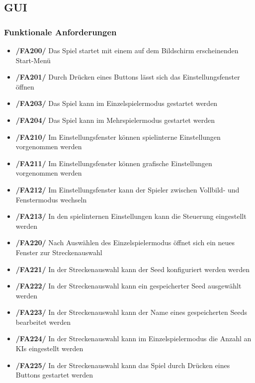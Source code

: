 \documentclass[parskip=full]{scrartcl}
\begin{document}
	\pagebreak
	
	\subsection{GUI}
	\subsubsection{Funktionale Anforderungen}
	\begin{itemize} [label={}]
		\item \textbf{/FA200/} Das Spiel startet mit einem auf dem Bildschirm erscheinenden Start-Menü
		\item \textbf{/FA201/} Durch Drücken eines Buttons lässt sich das Einstellungsfenster öffnen
		\item \textbf{/FA203/} Das Spiel kann im Einzelspielermodus gestartet werden
		\item \textbf{/FA204/} Das Spiel kann im Mehrspielermodus gestartet werden
		
		\item \textbf{/FA210/} Im Einstellungsfenster können spielinterne Einstellungen vorgenommen werden
		\item \textbf{/FA211/} Im Einstellungsfenster können grafische Einstellungen vorgenommen werden
		\item \textbf{/FA212/} Im Einstellungsfenster kann der Spieler zwischen Vollbild- und Fenstermodus wechseln
		\item \textbf{/FA213/} In den spielinternen Einstellungen kann die Steuerung eingestellt werden
		
		\item \textbf{/FA220/} Nach Auswählen des Einzelspielermodus öffnet sich ein neues Fenster zur Streckenauswahl
		\item \textbf{/FA221/} In der Streckenauswahl kann der \gls{Seed} konfiguriert werden werden	
		\item \textbf{/FA222/} In der Streckenauswahl kann ein gespeicherter \gls{Seed} ausgewählt werden
		\item \textbf{/FA223/} In der Streckenauswahl kann der Name eines gespeicherten \glspl{Seed} bearbeitet werden
		\item \textbf{/FA224/} In der Streckenauswahl kann im Einzelspielermodus die Anzahl an \glspl{KI} eingestellt werden	
		\item \textbf{/FA225/} In der Streckenauswahl kann das Spiel durch Drücken eines Buttons gestartet werden
		

\end{itemize}
\end{document}
